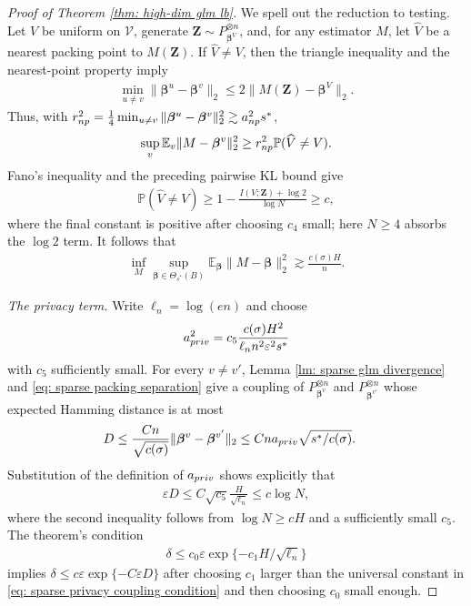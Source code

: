 \documentclass[letterpaper,12pt]{article}
\numberwithin{equation}{section}
\theoremstyle{plain}
\numberwithin{Theorem}{section}
\numberwithin{proposition}{section}
\numberwithin{Lemma}{section}
{
	\theoremstyle{definition}
	\newtheorem{Definition}{Definition}
	\newtheorem{example}{Example}
	\numberwithin{example}{section}
	\newtheorem{fact}{Fact}
	\numberwithin{fact}{section}
	\newtheorem{remark}{Remark}
}
\newcommand{\1}{\mathbbm{1}}
\def\bbeta{{\boldsymbol{\beta}}}
\def\Pr{\mathbb P}
\def\E{\mathbb{E}}
\begin{document}
\begin{proof}[Proof of Theorem \ref{thm: high-dim glm lb}]
We spell out the reduction to testing.  Let $V$ be uniform on
$\mathcal V$, generate $\bm Z\sim P_{\bbeta^V}^{\otimes n}$, and,
for any estimator $M$, let $\widehat V$ be a nearest packing point to
$M(\bm Z)$.  If $\widehat V\neq V$, then the triangle inequality and
the nearest-point property imply
\begin{align*}
    \min_{u\neq v}\|\bbeta^u-\bbeta^v\|_2
    \leq2\|M(\bm Z)-\bbeta^V\|_2.
\end{align*}
Thus, with
$r_{\rm np}^2=\frac14\min_{u\neq v}
\|\bbeta^u-\bbeta^v\|_2^2\gtrsim a_{\rm np}^2s^*$,
\begin{align*}
    \sup_v\E_v\|M-\bbeta^v\|_2^2
    \geq r_{\rm np}^2\Pr(\widehat V\neq V).
\end{align*}
Fano's inequality and the preceding pairwise KL bound give
\begin{align*}
    \Pr(\widehat V\neq V)
    \geq1-\frac{I(V;\bm Z)+\log2}{\log N}
    \geq c,
\end{align*}
where the final constant is positive after choosing $c_4$ small; here
$N\geq4$ absorbs the $\log2$ term.  It follows that
\begin{align}
    \inf_M\sup_{\bbeta\in\Theta_{s^*}(B)}
    \E_\bbeta\|M-\bbeta\|_2^2
    \gtrsim \frac{c(\sigma)H}{n}.                            \label{eq: sparse fano nonprivate term}
\end{align}

\textit{The privacy term.}
Write $\ell_n=\log(en)$ and choose
\begin{align*}
    a_{\rm priv}^2
    =c_5\frac{c(\sigma)H^2}{\ell_n n^2\varepsilon^2s^*}
\end{align*}
with $c_5$ sufficiently small.  For every $v\neq v'$, Lemma
\ref{lm: sparse glm divergence} and
\eqref{eq: sparse packing separation} give a coupling of
$P_{\bbeta^v}^{\otimes n}$ and
$P_{\bbeta^{v'}}^{\otimes n}$ whose expected Hamming distance is at
most
\begin{align*}
    D
    &\leq\frac{Cn}{\sqrt{c(\sigma)}}
      \|\bbeta^v-\bbeta^{v'}\|_2
      \leq Cn a_{\rm priv}\sqrt{s^*/c(\sigma)}.
\end{align*}
Substitution of the definition of $a_{\rm priv}$ shows explicitly
that
\begin{align}
    \varepsilon D
    \leq C\sqrt{c_5}\frac{H}{\sqrt{\ell_n}}
    \leq c\log N,                                         \label{eq: sparse privacy coupling condition}
\end{align}
where the second inequality follows from $\log N\geq cH$ and a
sufficiently small $c_5$.  The theorem's condition
\begin{align*}
    \delta\leq c_0\varepsilon
    \exp\{-c_1H/\sqrt{\ell_n}\}
\end{align*}
implies
$\delta\leq c\varepsilon\exp\{-C\varepsilon D\}$ after choosing
$c_1$ larger than the universal constant in
\eqref{eq: sparse privacy coupling condition} and then choosing $c_0$
small enough.


\end{proof}
\end{document}

